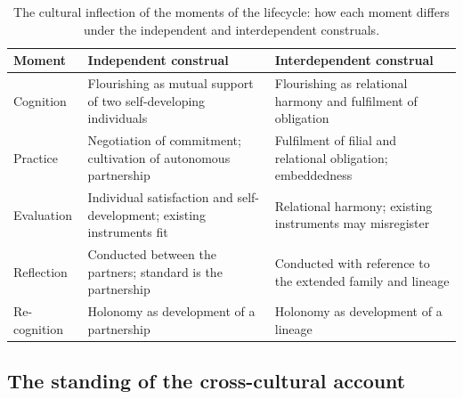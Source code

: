 \begin{table}[t]
\centering
\small
\renewcommand{\arraystretch}{1.25}
\caption{The cultural inflection of the moments of the lifecycle: how each moment differs under the independent and interdependent construals.}
\label{p11:tab:cc-cycle}
\begin{tabularx}{\linewidth}{@{}>{\raggedright\arraybackslash}p{2.4cm} >{\raggedright\arraybackslash}X >{\raggedright\arraybackslash}X@{}}
\toprule
\rowcolor{pageblush}
\textbf{\textcolor{rosedeep}{Moment}} & \textbf{\textcolor{rosedeep}{Independent construal}} & \textbf{\textcolor{rosedeep}{Interdependent construal}} \\
\midrule
Cognition & Flourishing as mutual support of two self-developing individuals & Flourishing as relational harmony and fulfilment of obligation \\
Practice & Negotiation of commitment; cultivation of autonomous partnership & Fulfilment of filial and relational obligation; embeddedness \\
Evaluation & Individual satisfaction and self-development; existing instruments fit & Relational harmony; existing instruments may misregister \\
Reflection & Conducted between the partners; standard is the partnership & Conducted with reference to the extended family and lineage \\
Re-cognition & Holonomy as development of a partnership & Holonomy as development of a lineage \\
\bottomrule
\end{tabularx}
\end{table}

\subsection{The standing of the cross-cultural account}
\label{p11:sec:cc-standing}

